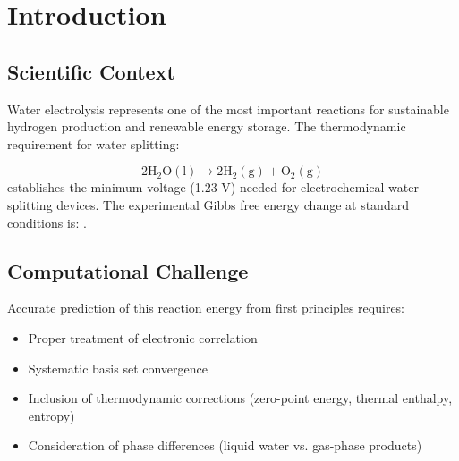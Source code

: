 \documentclass{template}
\begin{document}
\fairepagedegarde

\fairetabledesmatieres

\begin{abstract}
This report presents a comprehensive density functional theory (DFT) study of the water splitting reaction: 2H$_2$O(l) $\rightarrow$ 2H$_2$(g) + O$_2$(g). The investigation follows a systematic nine-task workflow, examining molecular geometries, electronic energies, basis set convergence, method hierarchy (Jacob's ladder), and thermodynamic corrections. Using PySCF with basis sets ranging from STO-3G to cc-pV5Z and methods including HF, MP2, CCSD, PBE, and PBE0, we calculated the reaction free energy at 298.15 K. The final result of $\Delta$G = 3.22 eV (MP2/cc-pVDZ with thermodynamic corrections) shows a deviation of -1.70 eV from the experimental value of 4.92 eV. The analysis reveals that basis set errors are negligible beyond cc-pVDZ, MP2 provides the best electronic accuracy, and thermodynamic corrections, particularly entropy terms, dominate the remaining discrepancy.
\end{abstract}

\section{Introduction}

\subsection{Scientific Context}
Water electrolysis represents one of the most important reactions for sustainable hydrogen production and renewable energy storage. The thermodynamic requirement for water splitting:

\begin{equation}
2\text{H}_2\text{O}(\text{l}) \rightarrow 2\text{H}_2(\text{g}) + \text{O}_2(\text{g})
\end{equation}
establishes the minimum voltage (1.23 V) needed for electrochemical water splitting devices. The experimental Gibbs free energy change at standard conditions is: .

\subsection{Computational Challenge}
Accurate prediction of this reaction energy from first principles requires:
\begin{itemize}
\item Proper treatment of electronic correlation
\item Systematic basis set convergence
\item Inclusion of thermodynamic corrections (zero-point energy, thermal enthalpy, entropy)
\item Consideration of phase differences (liquid water vs. gas-phase products)
\end{itemize}
\end{document}
